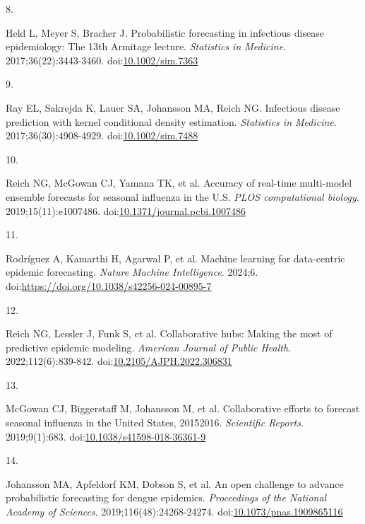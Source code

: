 \documentclass[
  letterpaper,
  DIV=11,
  numbers=noendperiod]{scrartcl}
\newlength{\cslhangindent}
\newlength{\csllabelwidth}
\newenvironment{CSLReferences}[2] %
 {\begin{list}{}{%
  \setlength{\itemindent}{0pt}
  \setlength{\leftmargin}{0pt}
  \setlength{\parsep}{0pt}
  \ifodd #1
   \setlength{\leftmargin}{\cslhangindent}
   \setlength{\itemindent}{-1\cslhangindent}
  \fi
  \setlength{\itemsep}{#2\baselineskip}}}
 {\end{list}}
\newcommand{\CSLLeftMargin}[1]{\parbox[t]{\csllabelwidth}{\strut#1\strut}}
\newcommand{\CSLRightInline}[1]{\parbox[t]{\linewidth - \csllabelwidth}{\strut#1\strut}}
\begin{document}
\begin{CSLReferences}{0}{1}
\CSLLeftMargin{8. }%
\CSLRightInline{Held L, Meyer S, Bracher J. Probabilistic forecasting in
infectious disease epidemiology: The 13th {Armitage} lecture.
\emph{Statistics in Medicine}. 2017;36(22):3443-3460.
doi:\href{https://doi.org/10.1002/sim.7363}{10.1002/sim.7363}}

\CSLLeftMargin{9. }%
\CSLRightInline{Ray EL, Sakrejda K, Lauer SA, Johansson MA, Reich NG.
Infectious disease prediction with kernel conditional density
estimation. \emph{Statistics in Medicine}. 2017;36(30):4908-4929.
doi:\href{https://doi.org/10.1002/sim.7488}{10.1002/sim.7488}}

\CSLLeftMargin{10. }%
\CSLRightInline{Reich NG, McGowan CJ, Yamana TK, et al. Accuracy of
real-time multi-model ensemble forecasts for seasonal influenza in the
{U}.{S}. \emph{PLOS computational biology}. 2019;15(11):e1007486.
doi:\href{https://doi.org/10.1371/journal.pcbi.1007486}{10.1371/journal.pcbi.1007486}}

\CSLLeftMargin{11. }%
\CSLRightInline{Rodríguez A, Kamarthi H, Agarwal P, et al. Machine
learning for data-centric epidemic forecasting. \emph{Nature Machine
Intelligence}. 2024;6.
doi:\url{https://doi.org/10.1038/s42256-024-00895-7}}

\CSLLeftMargin{12. }%
\CSLRightInline{Reich NG, Lessler J, Funk S, et al. Collaborative hubs:
Making the most of predictive epidemic modeling. \emph{American Journal
of Public Health}. 2022;112(6):839-842.
doi:\href{https://doi.org/10.2105/AJPH.2022.306831}{10.2105/AJPH.2022.306831}}

\CSLLeftMargin{13. }%
\CSLRightInline{McGowan CJ, Biggerstaff M, Johansson M, et al.
Collaborative efforts to forecast seasonal influenza in the United
States, 2015{\textendash}2016. \emph{Scientific Reports}. 2019;9(1):683.
doi:\href{https://doi.org/10.1038/s41598-018-36361-9}{10.1038/s41598-018-36361-9}}

\CSLLeftMargin{14. }%
\CSLRightInline{Johansson MA, Apfeldorf KM, Dobson S, et al. An open
challenge to advance probabilistic forecasting for dengue epidemics.
\emph{Proceedings of the National Academy of Sciences}.
2019;116(48):24268-24274.
doi:\href{https://doi.org/10.1073/pnas.1909865116}{10.1073/pnas.1909865116}}


\end{CSLReferences}
\end{document}
